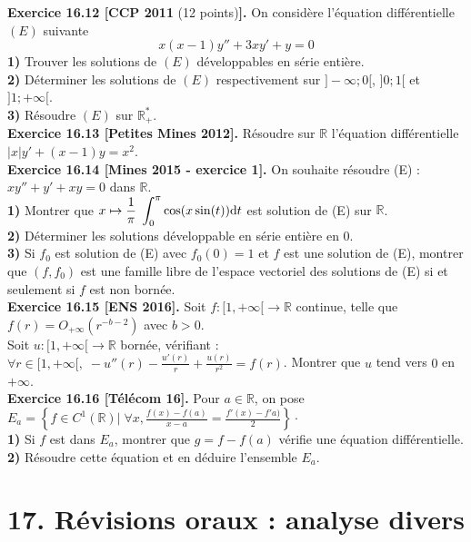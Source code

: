 \documentclass[a4paper,12pt,francais]{article}
\newcommand{\field}[1]{\mathbb{#1}}
\newcommand{\R}{\field{R}}
\begin{document}
\noindent
{\bf Exercice 16.12 [CCP 2011} (12 points){\bf ].} On considère l'équation différentielle $(E)$ suivante $$x(x-1)y''+3xy'+y=0$$
{\bf 1)} Trouver les solutions de $(E)$ développables en série entière.\\
{\bf 2)} Déterminer les solutions de $(E)$ respectivement sur $]-\infty;0[$, $]0;1[$ et $]1;+\infty[$.\\
{\bf 3)} Résoudre $(E)$ sur $\R_+^*$.\\

\noindent
{\bf Exercice 16.13 [Petites Mines 2012].} Résoudre sur $\R$ l'équation différentielle $|x|y'+(x-1)y=x^2$.\\

\noindent
{\bf Exercice 16.14 [Mines 2015 - exercice 1].}
On souhaite résoudre (E) : $xy''+y'+xy = 0$ dans $\R$.\\
{\bf 1)} Montrer que $\displaystyle x \mapsto \frac{1}{\pi}\; \int_0^\pi \cos(x \sin(t)) {\rm d}t $ est solution de (E) sur $\R$.\\
{\bf 2)} Déterminer les solutions développable en série entière en $0$.\\
{\bf 3)} Si $f_0$ est solution de (E) avec $f_0(0)=1$ et $f$ est une solution de (E),
montrer que $(f,f_0)$ est une famille libre de l'espace vectoriel des solutions de (E) si et seulement si
$f$ est non bornée.\\

\noindent
{\bf Exercice 16.15 [ENS 2016].} %
Soit $f : [1, +\infty[ \to  \R$ continue, telle que $f (r) = O_{+\infty}(r^{ -b-2})$ avec $b > 0$.\\
Soit $u:[1, +\infty[ \to \R$ bornée, vérifiant :$\forall r \in [1, +\infty[, \; -u'' (r) - \frac{u'(r)}{r} + \frac{u(r)}{r^2} = f (r)$. Montrer que $u$ tend vers $0$ en $+\infty$.\\

\noindent
{\bf Exercice 16.16 [Télécom 16].} %
Pour $a\in \R$, on pose 
$E_a=\left\{ f\in C^1(\R) | \; \forall x, \frac{f(x)-f(a)}{x-a}=\frac{f'(x)-f'a)}{2} \right\}\cdot$\\
{\bf 1)} Si $f$ est dans $E_a$, montrer que $g=f-f(a)$ vérifie une équation différentielle.\\
{\bf 2)} Résoudre cette équation et en déduire l'ensemble $E_a$.\\


\newpage
\section*{17. Révisions oraux : analyse divers} %
\end{document}
